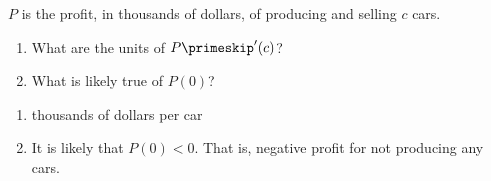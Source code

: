 {$P$ is the profit, in thousands of dollars, of producing and selling $c$ cars.
\begin{enumerate}
\item		What are the units of $P\primeskip'(c)$?
\item		What is likely true of $P(0)$?
\end{enumerate}
}
{\begin{enumerate}
\item		thousands of dollars per car
\item		It is likely that $P(0)<0$. That is, negative profit for not producing any cars.
\end{enumerate}
}
